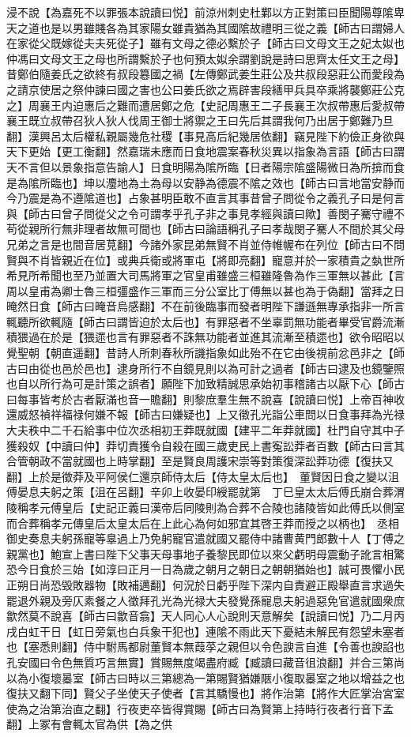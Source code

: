 浸不說【為嘉死不以罪張本說讀曰悦】前涼州刺史杜鄴以方正對策曰臣聞陽尊隂卑天之道也是以男雖賤各為其家陽女雖貴猶為其國隂故禮明三從之義【師古曰謂婦人在家從父既嫁從夫夫死從子】雖有文母之德必繫於子【師古曰文母文王之妃太姒也仲馮曰文母文王之母也所謂繫於子也何預太姒余謂劉說是詩曰思齊太任文王之母】昔鄭伯隨姜氏之欲終有叔段簒國之禍【左傳鄭武姜生莊公及共叔段惡莊公而愛段為之請京使居之祭仲諫曰國之害也公曰姜氏欲之焉辟害段繕甲兵具卒乘將襲鄭莊公克之】周襄王内迫惠后之難而遭居鄭之危【史記周惠王二子長襄王次叔帶惠后愛叔帶襄王既立叔帶召狄人狄人伐周王御士將禦之王曰先后其謂我何乃出居于鄭難乃旦翻】漢興呂太后權私親屬幾危社稷【事見高后紀幾居依翻】竊見陛下約儉正身欲與天下更始【更工衡翻】然嘉瑞未應而日食地震案春秋災異以指象為言語【師古曰謂天不言但以景象指意告諭人】日食明陽為隂所臨【日者陽宗隂盛陽微日為所揜而食是為隂所臨也】坤以灋地為土為母以安静為德震不隂之效也【師古曰言地當安静而今乃震是為不遵隂道也】占象甚明臣敢不直言其事昔曾子問從令之義孔子曰是何言與【師古曰曾子問從父之令可謂孝乎孔子非之事見孝經與讀曰歟】善閔子騫守禮不苟從親所行無非理者故無可間也【師古曰論語稱孔子曰孝哉閔子騫人不間於其父母兄弟之言是也間音居莧翻】今諸外家昆弟無賢不肖並侍帷幄布在列位【師古曰不問賢與不肖皆親近在位】或典兵衛或將軍屯【將即亮翻】寵意并於一家積貴之埶世所希見所希聞也至乃並置大司馬將軍之官皇甫雖盛三桓雖隆魯為作三軍無以甚此【言周以皇甫為卿士魯三桓彊盛作三軍而三分公室比丁傅無以甚也為于偽翻】當拜之日晻然日食【師古曰晻音烏感翻】不在前後臨事而發者明陛下謙遜無專承指非一所言輒聽所欲輒隨【師古曰謂皆迫於太后也】有罪惡者不坐辜罰無功能者畢受官爵流漸積猥過在於是【猥遝也言有罪惡者不誅無功能者並進其流漸至積遝也】欲令昭昭以覺聖朝【朝直遥翻】昔詩人所刺春秋所譏指象如此殆不在它由後視前忿邑非之【師古曰由從也邑於邑也】逮身所行不自鏡見則以為可計之過者【師古曰逮及也鏡鑒照也自以所行為可是計策之誤者】願陛下加致精誠思承始初事稽諸古以厭下心【師古曰每事皆考於古者厭滿也音一贍翻】則黎庶羣生無不說喜【說讀曰悦】上帝百神收還威怒禎祥福禄何嫌不報【師古曰嫌疑也】上又徵孔光詣公車問以日食事拜為光禄大夫秩中二千石給事中位次丞相初王莽既就國【建平二年莽就國】杜門自守其中子獲殺奴【中讀曰仲】莽切責獲令自殺在國三歲吏民上書寃訟莽者百數【師古曰言其合管朝政不當就國也上時掌翻】至是賢良周護宋崇等對策復深訟莽功德【復扶又翻】上於是徵莽及平阿侯仁還京師侍太后【侍太皇太后也】　董賢因日食之變以沮傅晏息夫躬之策【沮在呂翻】辛卯上收晏印綬罷就第　丁巳皇太太后傅氏崩合葬渭陵稱孝元傅皇后【史記正義曰漢帝后同陵則為合葬不合陵也諸陵皆如此傅氏以側室而合葬稱孝元傳皇后太皇太后在上此心為何如邪宜其啓王莽而授之以柄也】　丞相御史奏息夫躬孫寵等辠過上乃免躬寵官遣就國又罷侍中諸曹黄門郎數十人【丁傅之親黨也】鮑宣上書曰陛下父事天母事地子養黎民即位以來父虧明母震動子訛言相驚恐今日食於三始【如淳曰正月一日為歲之朝月之朝日之朝朝猶始也】誠可畏懼小民正朔日尚恐毁敗器物【敗補邁翻】何況於日虧乎陛下深内自責避正殿舉直言求過失罷退外親及旁仄素餐之人徵拜孔光為光禄大夫發覺孫寵息夫躬過惡免官遣就國衆庶歙然莫不說喜【師古曰歙音翕】天人同心人心說則天意解矣【說讀曰悦】乃二月丙戌白虹干日【虹日旁氣也白兵象干犯也】連隂不雨此天下憂結未解民有怨望未塞者也【塞悉則翻】侍中駙馬都尉董賢本無葭莩之親但以令色諛言自進【令善也諛諂也孔安國曰令色無質巧言無實】賞賜無度竭盡府臧【臧讀曰藏音徂浪翻】并合三第尚以為小復壞㬥室【師古曰時以三第總為一第賜賢猶嫌陿小復取㬥室之地以增益之也復扶又翻下同】賢父子坐使天子使者【言其驕慢也】將作治第【將作大匠掌治宮室使為之治第治直之翻】行夜吏卒皆得賞賜【師古曰為賢第上持時行夜者行音下孟翻】上冢有會輒太官為供【為之供